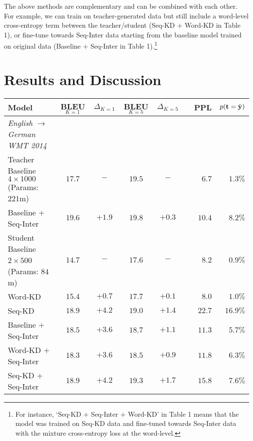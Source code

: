 \documentclass[11pt,letterpaper]{article}
\begin{document}
The above methods are complementary and can be combined with each other. For example,
we can train on teacher-generated data but still include a word-level cross-entropy term
between the teacher/student (Seq-KD $+$ Word-KD in Table 1), or fine-tune towards
Seq-Inter data starting from the baseline model trained on original data
(Baseline $+$ Seq-Inter in Table 1).\footnote{For instance, `Seq-KD $+$ Seq-Inter $+$ Word-KD' in Table 1 means
that the model was trained on Seq-KD data and fine-tuned towards Seq-Inter data with the
mixture cross-entropy loss at the word-level.}

\section{Results and Discussion}\label{results}
\begin{table*}[!ht] \label{de}
\centering
\small
\begin{tabular}{l c c  c c r r r }
\toprule
Model &    BLEU$_{K=1}$ & $\Delta_{K=1}$ & BLEU$_{K=5}$ & $\Delta_{K=5}$ & & PPL & $p(\mathbf{t} = \hat{\mathbf{y}})$ \\
\midrule
\textit{English $\rightarrow$ German WMT 2014} \\ 
\midrule
Teacher Baseline $4 \times 1000$  (Params: $221$m)  & $17.7$ &  $-$ & $19.5$&   $-$ & &  $6.7$ &  $1.3\%$ \\
\hspace{4mm} Baseline $+$  Seq-Inter  & $19.6$ & $+1.9$&  $19.8$& $+0.3$&  & $10.4$ & $8.2\%$   \\
\midrule
Student Baseline $2 \times 500$ $\,$ (Params: $84$m)  & $14.7$ & $-$ & $17.6$&  $-$ & & $8.2$ & $0.9\%$  \\
\hspace{4mm} Word-KD  & $15.4$ & $+0.7$& $17.7$& $+0.1$& & $8.0$ & $1.0\%$  \\
\hspace{4mm} Seq-KD   & $18.9$ & $+\mathbf{4.2}$& $19.0$& $+1.4$& & $22.7$ & $16.9\%$ \\
\hspace{4mm} Baseline $+$ Seq-Inter   & $18.5$ & $+3.6$& $18.7$& $+1.1$& & $11.3$ & $5.7\%$ \\
\hspace{4mm} Word-KD $+$ Seq-Inter  & $18.3$ & $+3.6$& $18.5$& $+0.9$& & $11.8$ & $6.3\%$ \\
\hspace{4mm} Seq-KD $+$ Seq-Inter  & $18.9$ & $+\mathbf{4.2}$&$19.3$ & $+\mathbf{1.7}$ & & $15.8$ & $7.6\%$  \\

\end{tabular}
\end{table*}
\end{document}
